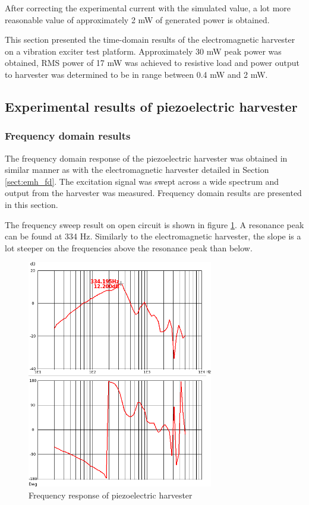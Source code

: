 After correcting the experimental current with the simulated value, a lot more reasonable value of approximately 2 mW of generated power is obtained. 

This section presented the time-domain results of the electromagnetic harvester on a vibration exciter test platform. Approximately 30 mW peak power was obtained, RMS power of 17 mW was achieved to resistive load and power output to harvester was determined to be in range between 0.4 mW and 2 mW. 

\subsection{Experimental results of piezoelectric harvester}
\subsubsection{Frequency domain results} \label{sect:piezo_fd}
The frequency domain response of the piezoelectric harvester was obtained in similar manner as with the electromagnetic harvester detailed in Section \ref{sect:emh_fd}. The excitation signal was swept across a wide spectrum and output from the harvester was measured. Frequency domain results are presented in this section.

The frequency sweep result on open circuit is shown in figure \ref{fig:piezo_fd}. A resonance peak can be found at 334 Hz. Similarly to the electromagnetic harvester, the slope is a lot steeper on the frequencies above the resonance peak than below. 

\begin{figure}[htb]
\begin{center}
\includegraphics[height=10cm]{images/own_measurement/generator_shaker/piezo_fd_open_2_3.png}
\end{center}
\caption{\label{fig:piezo_fd} Frequency response of piezoelectric harvester}
\end{figure}


